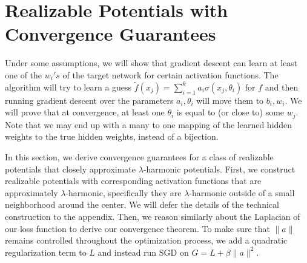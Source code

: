 
\section{Realizable Potentials with Convergence Guarantees}

{\color{red} Under some assumptions, we
will show that gradient descent can learn at least one of the $w_i's$
of the target network for certain activation functions. The algorithm
will try to learn a guess
$\widetilde{f}(x_j) = \sum_{i=1}^k a_i \sigma(x_j,\theta_i)$ for $f$
and then running gradient descent over the parameters $a_i, \theta_i$
will move them to $b_i, w_i$. We will prove that at convergence, at
least one $\theta_i$ is equal to (or close to) some $w_j$. Note that
we may end up with a many to one mapping of the learned hidden weights
to the true hidden weights, instead of a bijection.


}
 
In this section, we derive convergence guarantees for a class of realizable potentials that closely approximate $\lambda$-harmonic potentials. First, we construct realizable potentials with corresponding activation functions that are approximately $\lambda$-harmonic, specifically they are $\lambda$-harmonic outside of a small neighborhood around the center. We will defer the details of the technical construction to the appendix. Then, we reason similarly about the Laplacian of our loss function to derive our convergence theorem. To make sure that $\|a\|$ remains controlled throughout the optimization process, we add a quadratic regularization term to $L$ and instead run SGD on $G = L + \beta\|a\|^2$. 

